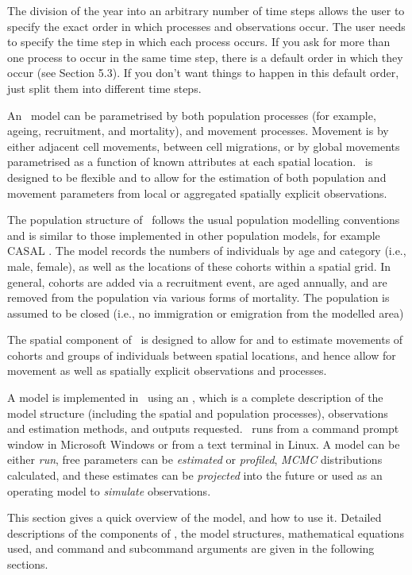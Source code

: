 The division of the year into an arbitrary number of time steps allows the user to specify the exact order in which processes and observations occur. The user needs to specify the time step in which each process occurs. If you ask for more than one process to occur in the same time step, there is a default order in which they occur (see Section 5.3). If you don't want things to happen in this default order, just split them into different time steps.

An \SPM\ model can be parametrised by both population processes (for example, ageing, recruitment, and mortality), and movement processes. Movement is by either adjacent cell movements, between cell migrations, or by global movements parametrised as a function of known attributes at each spatial location. \SPM\ is designed to be flexible and to allow for the estimation of both population and movement parameters from local or aggregated spatially explicit observations. 

The population structure of \SPM\ follows the usual population modelling conventions and is similar to those implemented in other population models, for example CASAL \citep{1388}. The model records the numbers of individuals by age and category (i.e., male, female), as well as the locations of these cohorts within a spatial grid. In general, cohorts are added via a recruitment event, are aged annually, and are removed from the population via various forms of mortality. The population is assumed to be closed (i.e., no immigration or emigration from the modelled area)

The spatial component of \SPM\ is designed to allow for and to estimate movements of cohorts and groups of individuals between spatial locations, and hence allow for movement as well as spatially explicit observations and processes. 

A model is implemented in \SPM\ using an \config {}, which is a complete description of the model structure (including the spatial and population processes), observations and estimation methods, and outputs requested. \SPM\ runs from a command prompt window in Microsoft Windows or from a text terminal in Linux. A model can be either \emph{run}, free parameters can be \emph{estimated} or \emph{profiled}, \emph{MCMC} distributions calculated, and these estimates can be \emph{projected} into the future or used as an operating model to \emph{simulate} observations.

This section gives a quick overview of the model, and how to use it. Detailed descriptions of the components of \SPM, the model structures, mathematical equations used, and command and subcommand arguments are given in the following sections.

